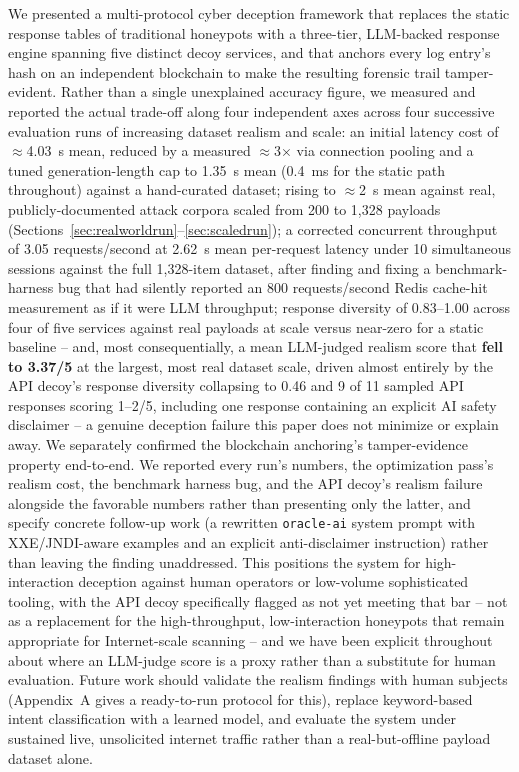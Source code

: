 \documentclass[conference]{IEEEtran}
\begin{document}
We presented a multi-protocol cyber deception framework that replaces the
static response tables of traditional honeypots with a three-tier,
LLM-backed response engine spanning five distinct decoy services, and that
anchors every log entry's hash on an independent blockchain to make the
resulting forensic trail tamper-evident. Rather than a single unexplained
accuracy figure, we measured and reported the actual trade-off along four
independent axes across four successive evaluation runs of increasing
dataset realism and scale: an initial latency cost of $\approx$4.03~s
mean, reduced by a measured $\approx$3$\times$ via connection pooling and
a tuned generation-length cap to 1.35~s mean (0.4~ms for the static path
throughout) against a hand-curated dataset; rising to $\approx$2~s mean
against real, publicly-documented attack corpora scaled from 200 to
1{,}328 payloads (Sections~\ref{sec:realworldrun}--\ref{sec:scaledrun}); a
corrected concurrent throughput of 3.05 requests/second at 2.62~s mean
per-request latency under 10 simultaneous sessions against the full
1{,}328-item dataset, after finding and fixing a benchmark-harness bug
that had silently reported an 800 requests/second Redis cache-hit
measurement as if it were LLM throughput; response diversity of
0.83--1.00 across four of five services against real payloads at scale
versus near-zero for a static baseline -- and, most consequentially, a
mean LLM-judged realism score that \textbf{fell to 3.37/5} at the largest,
most real dataset scale, driven almost entirely by the API decoy's
response diversity collapsing to 0.46 and 9 of 11 sampled API responses
scoring 1--2/5, including one response containing an explicit AI safety
disclaimer -- a genuine deception failure this paper does not minimize or
explain away. We separately confirmed the blockchain anchoring's
tamper-evidence property end-to-end. We reported every run's numbers, the
optimization pass's realism cost, the benchmark harness bug, and the API
decoy's realism failure alongside the favorable numbers rather than
presenting only the latter, and specify concrete follow-up work (a
rewritten \texttt{oracle-ai} system prompt with XXE/JNDI-aware examples and
an explicit anti-disclaimer instruction) rather than leaving the finding
unaddressed. This positions the system for high-interaction deception
against human operators or low-volume sophisticated tooling, with the API
decoy specifically flagged as not yet meeting that bar -- not as a
replacement for the high-throughput, low-interaction honeypots that
remain appropriate for Internet-scale scanning -- and we have been
explicit throughout about where an LLM-judge score is a proxy rather than
a substitute for human evaluation. Future work should validate the
realism findings with human subjects (Appendix~A gives a ready-to-run
protocol for this), replace keyword-based intent classification with a
learned model, and evaluate the system under sustained live, unsolicited
internet traffic rather than a real-but-offline payload dataset alone.
\end{document}
